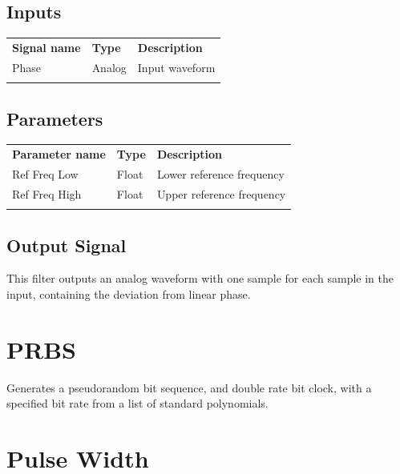\subsection{Inputs}

\begin{tabularx}{16cm}{llX}
\thickhline
\textbf{Signal name} & \textbf{Type} & \textbf{Description} \\
\thickhline
Phase & Analog & Input waveform \\
\thickhline
\end{tabularx}

\subsection{Parameters}

\begin{tabularx}{16cm}{llX}
\thickhline
\textbf{Parameter name} & \textbf{Type} & \textbf{Description} \\
\thickhline
Ref Freq Low & Float & Lower reference frequency\\
\thickhline
Ref Freq High & Float & Upper reference frequency\\
\thickhline
\end{tabularx}

\subsection{Output Signal}

This filter outputs an analog waveform with one sample for each sample in the input, containing the deviation from
linear phase.

\pagebreak
\section{PRBS}

Generates a pseudorandom bit sequence, and double rate bit clock, with a specified bit rate from a list of standard
polynomials.

\pagebreak
\section{Pulse Width}
\label{filter:pulsewidth}

